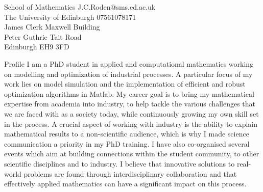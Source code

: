 \documentclass{resume} %
\begin{document}
School of Mathematics \hfill{J.C.Roden@sms.ed.ac.uk} \\
The University of Edinburgh  \hfill{07561078171}\\
James Clerk Maxwell Building\\
Peter Guthrie Tait Road\\
{Edinburgh EH9 3FD}

\begin{rSection}{Profile}
I am a PhD student in applied and computational mathematics working on modelling and optimization of industrial processes. A particular focus of my work lies on model simulation and the implementation of efficient and robust optimization algorithms in Matlab. My career goal is to bring my mathematical expertise from academia into industry, to help tackle the various challenges that we are faced with as a society today, while continuously growing my own skill set in the process. A crucial aspect of working with industry is the ability to explain mathematical results to a non-scientific audience, which is why I made science communication a priority in my PhD training. I have also co-organised several events which aim at building connections within the student community, to other scientific disciplines and to industry. I believe that innovative solutions to real-world problems are found through interdisciplinary collaboration and that effectively applied mathematics can have a significant impact on this process.
\vspace{0.7 cm}
\end{rSection}
\end{document}
